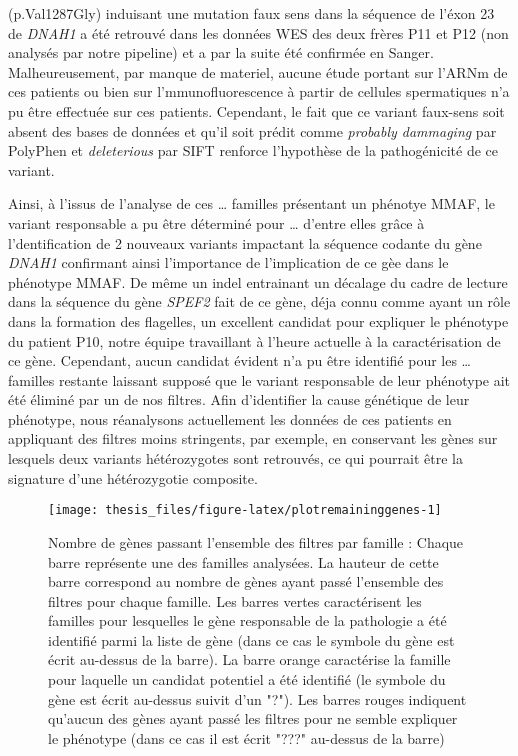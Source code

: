 \documentclass[12pt,twoside]{reedthesis}
\theoremstyle{definition}
\theoremstyle{definition}
\theoremstyle{remark}
\begin{document}
\begin{enumerate}
    (p.Val1287Gly) induisant une mutation faux sens dans la séquence de
    l'éxon 23 de \emph{DNAH1} a été retrouvé dans les données WES des deux
    frères P11 et P12 (non analysés par notre pipeline) et a par la suite
    été confirmée en Sanger. Malheureusement, par manque de materiel,
    aucune étude portant sur l'ARNm de ces patients ou bien sur
    l'mmunofluorescence à partir de cellules spermatiques n'a pu être
    effectuée sur ces patients. Cependant, le fait que ce variant
    faux-sens soit absent des bases de données et qu'il soit prédit comme
    \emph{probably dammaging} par PolyPhen et \emph{deleterious} par SIFT
    renforce l'hypothèse de la pathogénicité de ce variant.
  \end{enumerate}
  
  Ainsi, à l'issus de l'analyse de ces \ldots{} familles présentant un
  phénotye MMAF, le variant responsable a pu être déterminé pour \ldots{}
  d'entre elles grâce à l'dentification de 2 nouveaux variants impactant
  la séquence codante du gène \emph{DNAH1} confirmant ainsi l'importance
  de l'implication de ce gèe dans le phénotype MMAF. De même un indel
  entrainant un décalage du cadre de lecture dans la séquence du gène
  \emph{SPEF2} fait de ce gène, déja connu comme ayant un rôle dans la
  formation des flagelles, un excellent candidat pour expliquer le
  phénotype du patient P10, notre équipe travaillant à l'heure actuelle à
  la caractérisation de ce gène. Cependant, aucun candidat évident n'a pu
  être identifié pour les \ldots{} familles restante laissant supposé que
  le variant responsable de leur phénotype ait été éliminé par un de nos
  filtres. Afin d'identifier la cause génétique de leur phénotype, nous
  réanalysons actuellement les données de ces patients en appliquant des
  filtres moins stringents, par exemple, en conservant les gènes sur
  lesquels deux variants hétérozygotes sont retrouvés, ce qui pourrait
  être la signature d'une hétérozygotie composite.
  
  \newpage
  
  \begin{figure}
  
  {\centering \texttt{[image: thesis\_files/figure-latex/plotremaininggenes-1]} 
  
  }
  
  \caption[Nombre de gènes passant l'ensemble des filtres par famille]{Nombre de gènes passant l'ensemble des filtres par famille  :  Chaque barre représente une des familles analysées. La hauteur de cette barre correspond au nombre de gènes ayant passé l'ensemble des filtres pour chaque famille. Les barres vertes caractérisent les familles pour lesquelles le gène responsable de la pathologie a été identifié parmi la liste de gène (dans ce cas le symbole du gène est écrit au-dessus de la barre). La barre orange caractérise la famille pour laquelle un candidat potentiel a été identifié (le symbole du gène est écrit au-dessus suivit d'un "?"). Les barres rouges indiquent qu'aucun des gènes ayant passé les filtres pour ne semble expliquer le phénotype (dans ce cas il est écrit "???" au-dessus de la barre)}\label{fig:plotremaininggenes}
  \end{figure}
  
\end{document}
